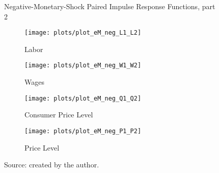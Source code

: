 \documentclass[../thesis.tex]{subfiles}
\begin{document}
\begin{figure}[h!]
	\centering
	\caption{Negative-Monetary-Shock Paired Impulse Response Functions, part 2}
	\begin{subfigure}[b]{0.48\textwidth}
		\centering
		\texttt{[image: plots/plot\_eM\_neg\_L1\_L2]}
		\caption{\scriptsize Labor}
		\label{fig:plot_eM_neg_L1_L2}
	\end{subfigure}
	\hspace*{0.3cm}
	\begin{subfigure}[b]{0.48\textwidth}
		\centering
		\texttt{[image: plots/plot\_eM\_neg\_W1\_W2]}
		\caption{\scriptsize Wages}
		\label{fig:plot_eM_neg_W1_W2}
	\end{subfigure}
	\vspace*{0.1cm}
	\begin{subfigure}[b]{0.48\textwidth}
		\centering
		\texttt{[image: plots/plot\_eM\_neg\_Q1\_Q2]}
		\caption{\scriptsize Consumer Price Level}
		\label{fig:plot_eM_neg_Q1_Q2}
	\end{subfigure}
	\hspace*{0.3cm}
	\begin{subfigure}[b]{0.48\textwidth}
		\centering
		\texttt{[image: plots/plot\_eM\_neg\_P1\_P2]}
		\caption{\scriptsize Price Level}
		\label{fig:plot_eM_neg_P1_P2}
	\end{subfigure}
	\caption*{Source: created by the author.}
	\label{fig:paired-neg-irf2}
\end{figure}
\end{document}
